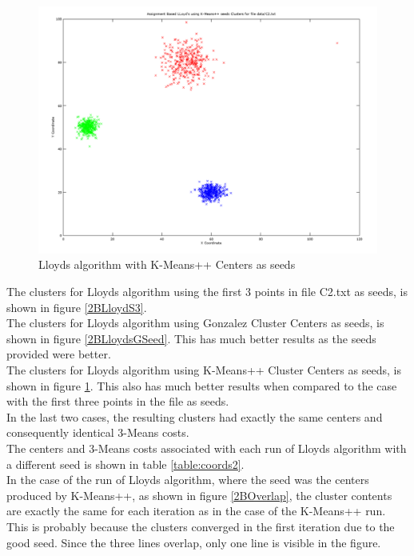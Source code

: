 \documentclass[11pt]{article}
\begin{document}
\begin{figure}[!htb]
\centering
\includegraphics[width=5in]{figures/2BLloydsKMPPSeed.png}
\caption{Lloyds algorithm with K-Means++ Centers as seeds}
\label{2BLloydsKMPPSeed}
\end{figure}

The clusters for Lloyds algorithm using the first $3$ points in file C2.txt as seeds, is shown in figure \ref{2BLloydS3}. \\

The clusters for Lloyds algorithm using Gonzalez Cluster Centers as seeds, is shown in figure \ref{2BLloydsGSeed}. This has much better results as the seeds provided were better.\\

The clusters for Lloyds algorithm using K-Means++ Cluster Centers as seeds, is shown in figure \ref{2BLloydsKMPPSeed}. This also has much better results when compared to the case with the first three points in the file as seeds.\\

In the last two cases, the resulting clusters had exactly the same centers and consequently identical 3-Means costs.\\ 

The centers and 3-Means costs associated with each run of Lloyds algorithm with a different seed is shown in table \ref{table:coords2}.\\

In the case of the run of Lloyds algorithm, where the seed was the centers produced by K-Means++, as shown in figure \ref{2BOverlap}, the cluster contents are exactly the same for each iteration as in the case of the K-Means++ run. This is probably because the clusters converged in the first iteration due to the good seed. Since the three lines overlap, only one line is visible in the figure.
\end{document}
